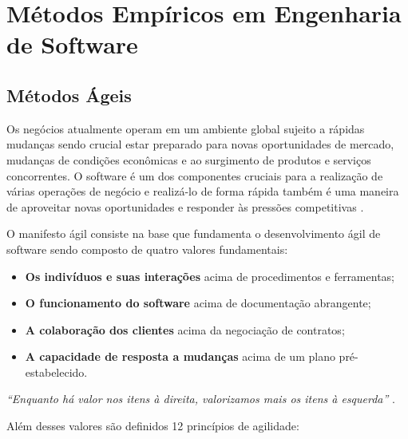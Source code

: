 \chapter{Métodos Empíricos em Engenharia de Software}

\section{Métodos Ágeis}
Os negócios atualmente operam em um ambiente global sujeito a rápidas mudanças sendo crucial estar preparado para novas oportunidades de mercado, mudanças de condições econômicas e ao surgimento de produtos e serviços concorrentes. O software é um dos componentes cruciais para a realização de várias operações de negócio e realizá-lo de forma rápida também é uma maneira de aproveitar novas oportunidades e responder às pressões competitivas \cite{sommerville_2006}.

O manifesto ágil \cite{beck2001agile} consiste na base que fundamenta o desenvolvimento ágil de
software sendo composto de quatro valores fundamentais:

\begin{itemize}
    \item \textbf{Os indivíduos e suas interações} acima de procedimentos e ferramentas;
    \item \textbf{O funcionamento do software} acima de documentação abrangente;
    \item \textbf{A colaboração dos clientes} acima da negociação de contratos;
    \item \textbf{A capacidade de resposta a mudanças} acima de um plano pré-estabelecido.
\end{itemize}

\textit{``Enquanto há valor nos itens à direita, valorizamos mais os itens à esquerda''} \cite{beck2001agile}.

Além desses valores são definidos 12 princípios de agilidade:

